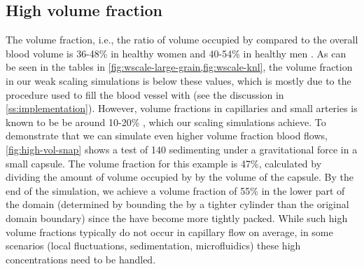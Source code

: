\subsection{High volume fraction}
The \rbc volume fraction, i.e., the ratio of volume occupied by \rbcs
compared to the overall blood volume is 36-48\% in healthy women and
40-54\% in healthy men \cite{billett1990hemoglobin}. As can be seen in the tables in
\cref{fig:wscale-large-grain,fig:wscale-knl}, the volume fraction in
our weak scaling simulations is below these values, which is mostly due to
the procedure used to fill the blood vessel with \rbcs (see the
discussion in \cref{ss:implementation}).
However, \rbc volume fractions in capillaries and small arteries is
known to be be around 10-20\%
\cite{wang2013simulation,saadat2019simulation}, which our scaling
simulations achieve.
To demonstrate that we can simulate even higher volume fraction blood flows,
\cref{fig:high-vol-snap} shows a test of 140 \rbcs sedimenting under a
gravitational force in a small capsule. The volume fraction for this example is
47\%, calculated by dividing the amount of volume occupied by \rbcs by the
volume of the capsule.
By the end of the simulation, we achieve a volume fraction
of 55\% in the lower part of the domain (determined by bounding the
\rbcs by a tighter cylinder than the original domain boundary) since
the \rbcs have become more tightly packed.
While such high volume fractions typically do not occur in capillary flow on average, in some scenarios (local fluctuations, sedimentation, microfluidics) these high concentrations need to be handled. 

